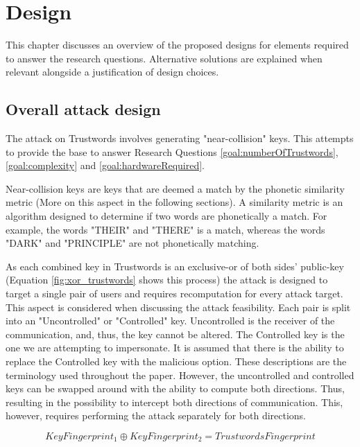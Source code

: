 \chapter{Design}
\label{cha:Design}

This chapter discusses an overview of the proposed designs for elements required to answer the research questions. Alternative solutions are explained when relevant alongside a justification of design choices.

\section{Overall attack design}

The attack on Trustwords involves generating "near-collision" keys. 
This attempts to provide the base to answer Research Questions \ref{goal:numberOfTrustwords}, \ref{goal:complexity} and \ref{goal:hardwareRequired}.

Near-collision keys are keys that are deemed a match by the phonetic similarity metric (More on this aspect in the following sections). A similarity metric is an algorithm designed to determine if two words are phonetically a match. For example, the words "THEIR" and "THERE" is a match, whereas the words "DARK" and "PRINCIPLE" are not phonetically matching.

As each combined key in Trustwords is an exclusive-or of both sides' public-key (Equation \ref{fig:xor_trustwords} shows this process) the attack is designed to target a single pair of users and requires recomputation for every attack target. This aspect is considered when discussing the attack feasibility. Each pair is split into an "Uncontrolled" or "Controlled" key. Uncontrolled is the receiver of the communication, and, thus, the key cannot be altered. The Controlled key is the one we are attempting to impersonate. It is assumed that there is the ability to replace the Controlled key with the malicious option. These descriptions are the terminology used throughout the paper. However, the uncontrolled and controlled keys can be swapped around with the ability to compute both directions. Thus, resulting in the possibility to intercept both directions of communication. This, however, requires performing the attack separately for both directions.

\begin{equation}
    KeyFingerprint_{1} \oplus KeyFingerprint_{2} = TrustwordsFingerprint
\end{equation}
\label{fig:xor_trustwords}


